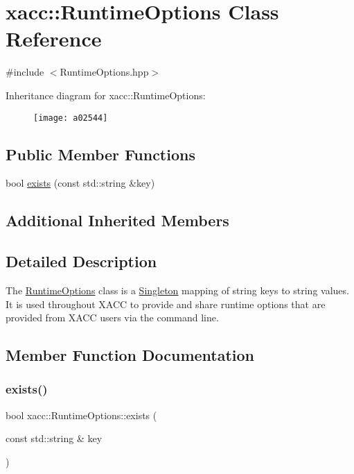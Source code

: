 \hypertarget{a02544}{}\section{xacc\+:\+:Runtime\+Options Class Reference}
\label{a02544}


{\ttfamily \#include $<$Runtime\+Options.\+hpp$>$}

Inheritance diagram for xacc\+:\+:Runtime\+Options\+:\begin{figure}[H]
\begin{center}
\leavevmode
\texttt{[image: a02544]}
\end{center}
\end{figure}
\subsection*{Public Member Functions}
\begin{DoxyCompactItemize}
\item 
bool \hyperlink{a02544_a3603aecb87461efedd0fabbef966c80c}{exists} (const std\+::string \&key)
\end{DoxyCompactItemize}
\subsection*{Additional Inherited Members}


\subsection{Detailed Description}
The \hyperlink{a02544}{Runtime\+Options} class is a \hyperlink{a02548}{Singleton} mapping of string keys to string values. It is used throughout X\+A\+CC to provide and share runtime options that are provided from X\+A\+CC users via the command line. 

\subsection{Member Function Documentation}
\mbox{\label{a02544_a3603aecb87461efedd0fabbef966c80c}} 
\subsubsection{\texorpdfstring{exists()}{exists()}}
{\footnotesize\ttfamily bool xacc\+::\+Runtime\+Options\+::exists (\begin{DoxyParamCaption}\item[{const std\+::string \&}]{key }\end{DoxyParamCaption})\hspace{0.3cm}{\ttfamily [inline]}}


